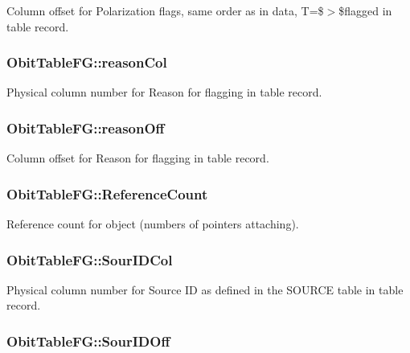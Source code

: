 Column offset for Polarization flags, same order as in data, T=\$$>$\$flagged in table record. 

\subsubsection{ {\bf Obit\-Table\-FG::reason\-Col}}\label{structObitTableFG_o32}


Physical column number for Reason for flagging in table record. 

\subsubsection{ {\bf Obit\-Table\-FG::reason\-Off}}\label{structObitTableFG_o31}


Column offset for Reason for flagging in table record. 

\subsubsection{ {\bf Obit\-Table\-FG::Reference\-Count}}\label{structObitTableFG_o2}


Reference count for object (numbers of pointers attaching). 

\subsubsection{ {\bf Obit\-Table\-FG::Sour\-IDCol}}\label{structObitTableFG_o16}


Physical column number for Source ID as defined in the SOURCE table in table record. 

\subsubsection{ {\bf Obit\-Table\-FG::Sour\-IDOff}}\label{structObitTableFG_o15}



